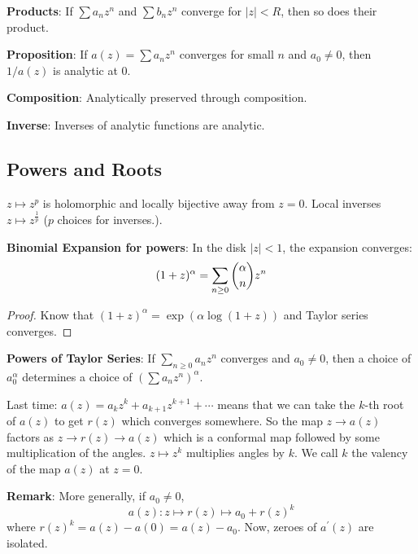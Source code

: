 \documentclass{report}
\begin{document}
\textbf{Products}: If $\sum a_{n}z^{n}$ and $\sum b_{n}z^{n}$ converge for $\lvert z \rvert < R$, then so does their product.

\textbf{Proposition}: If $a(z) = \sum a_{n}z^{n}$ converges for small $n$ and $a_{0} \neq 0$, then $1/a(z)$ is analytic at $0$.

\textbf{Composition}: Analytically preserved through composition.

\textbf{Inverse}: Inverses of analytic functions are analytic.

\begin{topic}
    \section{Powers and Roots}
\end{topic}

$z \mapsto z^{p}$ is holomorphic and locally bijective away from $z = 0$. Local inverses $z \mapsto z^{\frac{1}{p}}$ ($p$ choices for inverses.).

\textbf{Binomial Expansion for powers}: In the disk $\lvert z \rvert < 1$, the expansion converges:
    \begin{equation*}
        (1 + z)^{\alpha} = \sum_{n \geq 0} \dbinom{\alpha}{n}z^{n}
    \end{equation*}
    \begin{proof}
        Know that $(1 + z)^{\alpha} = \exp(\alpha\log(1 + z))$ and Taylor series converges.
    \end{proof}

\textbf{Powers of Taylor Series}: If $\sum_{ n \geq 0} a_{n}z^{n}$ converges and $a_{0} \neq 0$, then a choice of $a_{0}^{\alpha}$ determines a choice of $(\sum a_{n}z^{n})^{\alpha}$.

Last time: $a(z) = a_{k}z^{k} + a_{k + 1}z^{k + 1} + \cdots$ means that we can take the $k$-th root of $a(z)$ to get $r(z)$ which converges somewhere. So the map $z \rightarrow a(z)$ factors as $z \rightarrow r(z) \rightarrow a(z)$ which is a conformal map followed by some multiplication of the angles. $z \mapsto z^{k}$ multiplies angles by $k$. We call $k$ the valency of the map $a(z)$ at $z = 0$. 

\textbf{Remark}: More generally, if $a_{0} \neq 0$, 
    \begin{equation*}
        a(z) : z \mapsto r(z) \mapsto a_{0} + r(z)^{k}
    \end{equation*}
where $r(z)^{k} = a( z) - a(0) = a(z) - a_{0}$. Now, zeroes of $a^{\prime}(z)$ are isolated.
\end{document}
